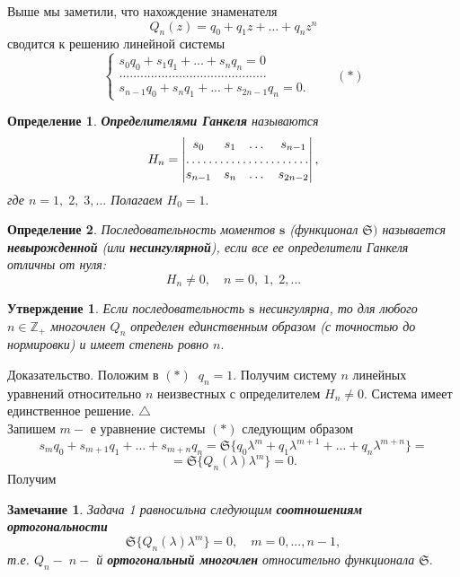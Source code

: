 \documentclass[12pt,a4paper]{article}
\theoremstyle{plain}   \newtheorem{Pro}{Задача}
\newtheorem{Sta}{Утверждение}
\newtheorem{Def}{Определение}
\newtheorem{Rem}{Замечание}
\begin{document}
Выше мы заметили, что нахождение знаменателя
$$
  Q_n (z)=q_0 +q_1 z+...+q_n z^n
$$
сводится к решению линейной системы
\begin{equation*}
  \begin{cases}
    s_0 q_0 +s_1 q_1 +...+s_n q_n =0\\
	..........................................\\
	s_{n-1}q_0 +s_n q_1 +...+s_{2n-1}q_n =0.
  \end{cases}
  \qquad (\ast )
\end{equation*}
\begin{Def}
{\bfseries Определителями Ганкеля}
называются
\begin{equation*}
  H_n =
    \begin{vmatrix}
	  s_0 & s_1 & \dots & s_{n-1}\\
	  \hdotsfor{4}\\
	  s_{n-1} & s_n & \dots & s_{2n-2}
	\end{vmatrix},
\end{equation*}
где
$ n=1, \; 2, \; 3,... $
Полагаем
$ H_0 =1. $
\end{Def}
\begin{Def}
Последовательность моментов
$ \mathbf{s} $
(функционал
$ \mathfrak{S}) $
называется
{\bfseries невырожденной}
(или
{\bfseries несингулярной}),
если все ее определители Ганкеля отличны от нуля:
$$
  H_n \not = 0, \quad n=0, \; 1, \; 2,...
$$
\end{Def}
\begin{Sta}
Если последовательность
$ \mathbf{s} $
несингулярна, то для любого
$ n \in \mathbb{Z}_+ $
многочлен
$ Q_n $
определен единственным образом (с точностью до нормировки) и
имеет степень ровно
$ n. $
\end{Sta}
{\Large Доказательство.}
Положим в
$ (\ast ) \; \; q_n =1. $
Получим систему
$ n $
линейных уравнений относительно
$ n $
неизвестных с определителем
$ H_n \not = 0. $
Система имеет единственное решение.
$ \triangle $
\\

Запишем
$ m- $
е уравнение системы
$ ( \ast ) $
следующим образом
$$
  s_m q_0 +s_{m+1} q_1 +...+s_{m+n} q_n =
  \mathfrak{S} \{ q_0 \lambda ^m +q_1 \lambda ^{m+1}+...+
  q_n \lambda ^{m+n} \} =
$$
$$
  =\mathfrak{S} \{ Q_n (\lambda ) \lambda ^m \}=0.
$$
Получим
\begin{Rem}
Задача 1 равносильна следующим
{\bfseries соотношениям ортогональности}
$$
  \mathfrak{S} \{ Q_n (\lambda ) \lambda ^m \} =0,
  \quad m=0,...,n-1,
$$
т.е.
$ Q_n - \; n- $
й
{\bfseries ортогональный многочлен}
относительно функционала
$ \mathfrak{S}. $
\end{Rem}
$ \; $
\\
\end{document}
